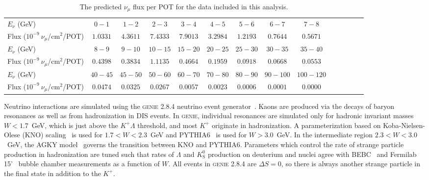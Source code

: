 \documentclass[aps,prl,preprint,showpacs,superscriptaddress,nofootinbib,floatfix,linenumbers]{revtex4}
\newcommand{\genie}{\textsc{genie}\xspace}
\newcommand{\lam}{\ensuremath{\Lambda}\xspace}
\newcommand{\kp}{\ensuremath{K^{+}}\xspace}
\newcommand{\kzS}{\ensuremath{K^{0}_{\mathrm{S}}}\xspace}
\begin{document}
\begingroup
\squeezetable
\begin{table}[t]
\centering
\begin{tabular}{l|ccccccccccccc}
\hline \hline
$E_\nu$ (GeV) & 
$0 - 1$ &
$1 - 2$ &
$2 - 3$ &
$3 - 4$ &
$4 - 5$ &
$5 - 6$ &
$6 - 7$ &
$7 - 8$ \\
Flux ($10^{-9}~\nu_{\mu}$/cm$^2$/POT) &
$1.0331  $ &
$4.3611  $ &
$7.4333  $ &
$7.9013  $ &
$3.2984  $ &
$1.2193  $ &
$0.7644  $ &
$0.5671  $ \\
\hline
$E_\nu$ (GeV) & 
$8 - 9$ &
$9 - 10$ &
$10 - 15$ &
$15 - 20$ &
$20 - 25$ &
$25 - 30$ &
$30 - 35$ &
$35 - 40$ \\
Flux ($10^{-9}~\nu_{\mu}$/cm$^2$/POT) &
$0.4398  $ &
$0.3834  $ &
$1.1135  $ &
$0.4664  $ &
$0.1959  $ &
$0.0918  $ &
$0.0668  $ &
$0.0553  $ \\
\hline
$E_\nu$ (GeV) & 
$40 - 45$ &
$45 - 50$ &
$50 - 60$ &
$60 - 70$ &
$70 - 80$ &
$80 - 90$ &
$90 - 100$ &
$100 - 120$ \\
Flux ($10^{-9}~\nu_{\mu}$/cm$^2$/POT) &
$0.0474  $ &
$0.0325  $ &
$0.0267  $ &
$0.0057  $ &
$0.0023  $ &
$0.0006  $ &
$0.0001  $ &
$0.0000  $ \\
\hline
\hline
\end{tabular}
\caption{The predicted $\nu_\mu$ flux per POT for the data included in this analysis.}
\label{tab:nu_flux}
\end{table}
\endgroup

Neutrino interactions are simulated using the \genie 2.8.4 neutrino event generator~\cite{genieNIM}. Kaons are produced via the decays of baryon resonances as well as from hadronization in DIS events. In \genie, individual resonances are simulated only for hadronic invariant masses $W < 1.7$~GeV, which is just above the $K^{+} \Lambda$ threshold, and most \kp originate in hadronization. A parameterization based on Koba-Nielsen-Olese (KNO) scaling~\cite{kno} is used for $1.7 < W < 2.3$~GeV and PYTHIA6~\cite{pythia} is used for $W > 3.0$~GeV. In the intermediate region $2.3 < W < 3.0$~GeV, the AGKY model~\cite{agky} governs the transition between KNO and PYTHIA6. Parameters which control the rate of strange particle production in hadronization are tuned such that rates of \lam and \kzS production on deuterium and nuclei agree with BEBC~\cite{bebc1, bebc2, bebc3, bebc4} and Fermilab 15'~\cite{fnal15a, fnal15b} bubble chamber measurements as a function of $W$. All events in \genie 2.8.4 are $\Delta S = 0$, so there is always another strange particle in the final state in addition to the $K^{+}$.
\end{document}
